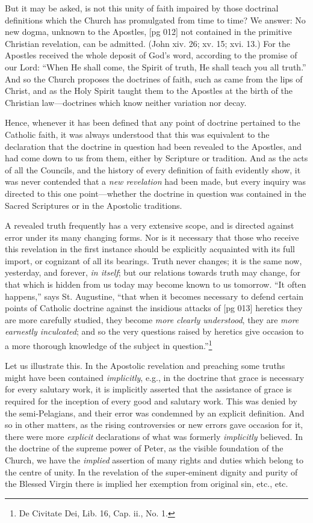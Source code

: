 But it may be asked, is not this unity of faith
impaired by those doctrinal definitions which the
Church has promulgated from time to time? We
answer: No new dogma, unknown to the Apostles,
[pg 012]
not contained in the primitive Christian revelation,
can be admitted. (John xiv. 26; xv. 15; xvi. 13.)
For the Apostles received the whole deposit of
God's word, according to the promise of our Lord:
“When He shall come, the Spirit of truth, He
shall teach you all truth.” And so the Church
proposes the doctrines of faith, such as came
from the lips of Christ, and as the Holy Spirit
taught them to the Apostles at the birth of the
Christian law—doctrines which know neither
variation nor decay.

Hence, whenever it has been defined that any
point of doctrine pertained to the Catholic faith, it
was always understood that this was equivalent to
the declaration that the doctrine in question had
been revealed to the Apostles, and had come down
to us from them, either by Scripture or tradition.
And as the acts of all the Councils, and the history
of every definition of faith evidently show, it was
never contended that a \emph{new revelation} had been
made, but every inquiry was directed to this one
point—whether the doctrine in question was contained
in the Sacred Scriptures or in the Apostolic
traditions.

A revealed truth frequently has a very extensive
scope, and is directed against error under its many
changing forms. Nor is it necessary that those
who receive this revelation in the first instance
should be explicitly acquainted with its full import,
or cognizant of all its bearings. Truth never
changes; it is the same now, yesterday, and forever,
\emph{in itself}; but our relations towards truth may
change, for that which is hidden from us today
may become known to us tomorrow. “It often
happens,” says St. Augustine, “that when it becomes
necessary to defend certain points of Catholic
doctrine against the insidious attacks of
[pg 013]
heretics they are more carefully studied, they become
\emph{more clearly understood}, they are \emph{more
earnestly inculcated}; and so the very questions
raised by heretics give occasion to a more thorough
knowledge of the subject in question.”\footnote{De
Civitate Dei, Lib. 16, Cap. ii., No. 1.}

Let us illustrate this. In the Apostolic revelation
and preaching some truths might have been
contained \emph{implicitly}, e.g., in the doctrine that
grace is necessary for every salutary work, it is
implicitly asserted that the assistance of grace is
required for the inception of every good and salutary
work. This was denied by the semi-Pelagians,
and their error was condemned by an explicit
definition. And so in other matters, as the rising
controversies or new errors gave occasion for it,
there were more \emph{explicit} declarations of what was
formerly \emph{implicitly} believed. In the doctrine of
the supreme power of Peter, as the visible foundation
of the Church, we have the \emph{implied} assertion
of many rights and duties which belong to the
centre of unity. In the revelation of the super-eminent
dignity and purity of the Blessed Virgin
there is implied her exemption from original sin,
etc., etc.

